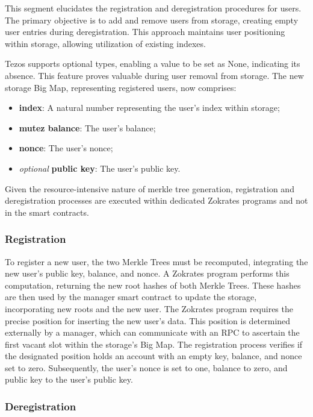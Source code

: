 This segment elucidates the registration and deregistration procedures for users. The primary objective is to add and remove users from storage, creating empty user entries during deregistration. This approach maintains user positioning within storage, allowing utilization of existing indexes.

Tezos supports optional types, enabling a value to be set as None, indicating its absence. This feature proves valuable during user removal from storage. The new storage Big Map, representing registered users, now comprises:
\begin{itemize}
	\item \textbf{index}: A natural number representing the user's index within storage;
	\item \textbf{mutez balance}: The user's balance;
	\item \textbf{nonce}: The user's nonce;
	\item \textit{optional} \textbf{public key}: The user's public key.
\end{itemize}

Given the resource-intensive nature of merkle tree generation, registration and deregistration processes are executed within dedicated Zokrates programs and not in the smart contracts.

\subsubsection{Registration\label{subsec:registration}}

To register a new user, the two Merkle Trees must be recomputed, integrating the new user's public key, balance, and nonce. A Zokrates program performs this computation, returning the new root hashes of both Merkle Trees. These hashes are then used by the manager smart contract to update the storage, incorporating new roots and the new user. The Zokrates program requires the precise position for inserting the new user's data. This position is determined externally by a manager, which can communicate with an RPC to ascertain the first vacant slot within the storage's Big Map. The registration process verifies if the designated position holds an account with an empty key, balance, and nonce set to zero. Subsequently, the user's nonce is set to one, balance to zero, and public key to the user's public key.

\subsubsection{Deregistration}

